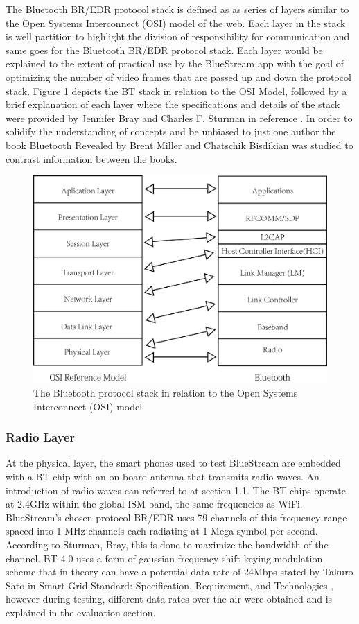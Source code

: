 \documentclass[a4paper,12pt]{article}
\begin{document}
The Bluetooth BR/EDR protocol stack is defined as as series of layers similar to the Open Systems Interconnect (OSI) model of the web. Each layer in the stack is well partition to highlight the division of responsibility for communication and same goes for the Bluetooth BR/EDR protocol stack. Each layer would be explained to the extent of practical use by the BlueStream app with the goal of optimizing the number of video frames that are passed up and down the protocol stack. Figure \ref{fig:BTandOSIStack} depicts the BT stack in relation to the OSI Model, followed by a brief explanation of each layer where the specifications and details of the stack were provided by Jennifer Bray and Charles F. Sturman in reference \cite{ConnectWithoutCables}. In order to solidify the understanding of concepts and be unbiased to just one author the book Bluetooth Revealed by Brent Miller and Chatschik Bisdikian was studied to contrast information between the books\cite{BlueToothRevealed}.

\begin{figure}[h!]
\centering
\includegraphics[scale=1]{Figures/Figure2.png}
\caption{The Bluetooth protocol stack in relation to the Open Systems Interconnect (OSI) model}
\label{fig:BTandOSIStack}
\end{figure}

\subsubsection{Radio Layer}
At the physical layer, the smart phones used to test BlueStream are embedded with a BT chip with an on-board antenna that transmits radio waves. An introduction of radio waves can referred to at section 1.1. The BT chips operate at 2.4GHz within the global ISM band, the same frequencies as WiFi. BlueStream’s chosen protocol BR/EDR uses 79 channels of this frequency range spaced into 1 MHz channels each radiating at 1 Mega-symbol per second. According to Sturman, Bray, this is done to maximize the bandwidth of the channel. BT 4.0 uses a form of gaussian frequency shift keying modulation scheme that in theory can have a potential data rate of 24Mbps stated by Takuro Sato in Smart Grid Standard: Specification, Requirement, and Technologies \cite{SmartGrids}, however during testing, different data rates over the air were obtained and is explained in the evaluation section. 
\end{document}
